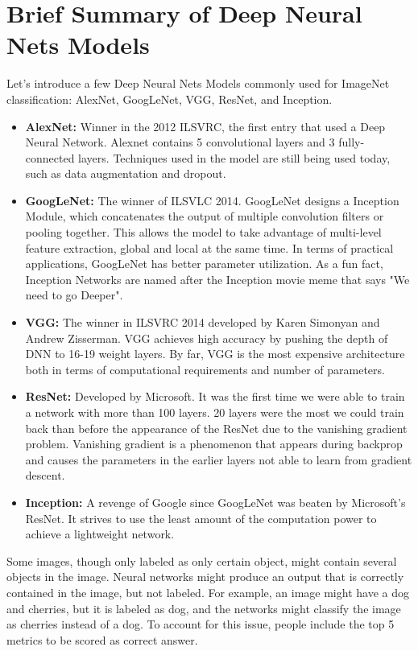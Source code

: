 \section{Brief Summary of Deep Neural Nets Models}
Let's introduce a few Deep Neural Nets Models commonly used for ImageNet classification: AlexNet, GoogLeNet, VGG, ResNet, and Inception.
\begin{itemize}
    \item \textbf{AlexNet:}  Winner in the 2012 ILSVRC, the first entry that used a Deep Neural Network. Alexnet contains 5 convolutional layers and 3 fully-connected layers. Techniques used in the model are still being used today, such as data augmentation and dropout.
    \item \textbf{GoogLeNet:} The winner of ILSVLC 2014. GoogLeNet designs a Inception Module, which concatenates the output of multiple convolution filters or pooling together.  This allows the model to take advantage of multi-level feature extraction, global and local at the same time. In terms of practical applications, GoogLeNet has better parameter utilization. As a fun fact, Inception Networks are named after the Inception movie meme that says "We need to go Deeper".
    \item \textbf{VGG:}  The winner in ILSVRC 2014 developed by Karen Simonyan and Andrew Zisserman. VGG achieves high accuracy by pushing the depth of DNN to 16-19 weight layers. By far, VGG is the most expensive architecture both in terms of computational requirements and number of parameters.
    \item \textbf{ResNet:} Developed by Microsoft. It was the first time we were able to train a network with more than 100 layers. 20 layers were the most we could train back than before the appearance of the ResNet due to the vanishing gradient problem. Vanishing gradient is a phenomenon that appears during backprop and causes the parameters in the earlier layers not able to learn from gradient descent.
    \item \textbf{Inception:} A revenge of Google since GoogLeNet was beaten by Microsoft's ResNet. It strives to use the least amount of the computation power to achieve a lightweight network.
\end{itemize}

Some images, though only labeled as only certain object, might contain several objects in the image. Neural networks might produce an output that is correctly contained in the image, but not labeled. For example, an image might have a dog and cherries, but it is labeled as dog, and the networks might classify the image as cherries instead of a dog. To account for this issue, people include the top 5 metrics to be scored as correct answer.

